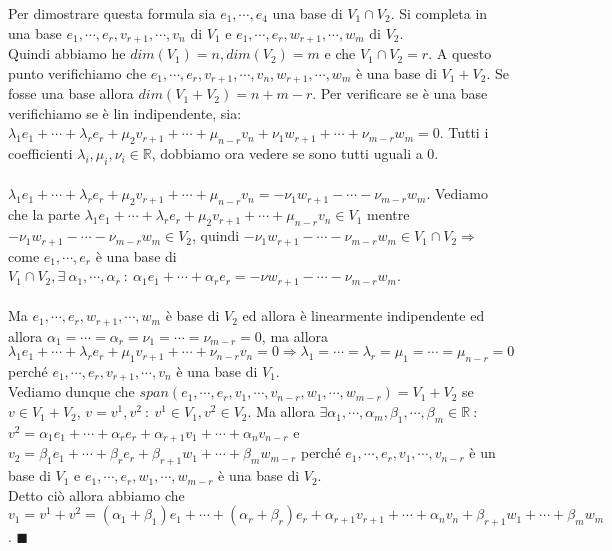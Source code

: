 \begin{demostration}
Per dimostrare questa formula sia $e_1, \cdots, e_4$ una base di $V_1 \cap V_2$. Si completa in una base $e_1, \cdots, e_r, v_{r+1}, \cdots, v_n$ di $V_1$ e $e_1, \cdots, e_r, w_{r+1}, \cdots, w_m$ di $V_2$. \\
Quindi abbiamo he $dim(V_1) = n, dim(V_2) = m$ e che $V_1 \cap V_2 = r$. A questo punto verifichiamo che $e_1, \cdots, e_r, v_{r+1}, \cdots, v_n, w_{r+1}, \cdots, w_m$ è una base di $V_1 + V_2$. Se fosse una base allora $dim(V_1 + V_2) = n + m - r$.
Per verificare se è una base verifichiamo se è lin indipendente, sia:\\
$\lambda_1 e_1 + \cdots + \lambda_r e_r + \mu_2 v_{r+1} + \cdots + \mu_{n-r}v_n + \nu_1 w_{r+1} + \cdots + \nu_{m-r}w_m = 0$. Tutti i coefficienti $\lambda_i, \mu_i, \nu_i \in \mathbb{R}$, dobbiamo ora vedere se sono tutti uguali a 0.\\\\
$\lambda_1 e_1 + \cdots + \lambda_r e_r + \mu_2 v_{r+1} + \cdots + \mu_{n-r}v_n = -\nu_1 w_{r+1} - \cdots - \nu_{m-r}w_m$. Vediamo che la parte $\lambda_1 e_1 + \cdots + \lambda_r e_r + \mu_2 v_{r+1} + \cdots + \mu_{n-r}v_n \in V_1$ mentre $-\nu_1 w_{r+1} - \cdots - \nu_{m-r}w_m \in V_2$, quindi $-\nu_1 w_{r+1} - \cdots - \nu_{m-r}w_m \in V_1 \cap V_2 \Longrightarrow$ come $e_1, \cdots, e_r$ è una base di $V_1 \cap V_2, \exists \: \alpha_1, \cdots, \alpha_r \::\: \alpha_1 e_1 + \cdots + \alpha_r e_r = -\nu w_{r+1} - \cdots - \nu_{m-r}w_m$. \\\\
Ma $e_1, \cdots, e_r, w_{r+1}, \cdots, w_m$ è base di $V_2$ ed allora è linearmente indipendente ed allora $\alpha_1 = \cdots = \alpha_r = \nu_1 = \cdots = \nu_{m-r} = 0$, ma allora $\lambda_1 e_1 + \cdots + \lambda_r e_r + \mu_1 v_{r+1} + \cdots + \nu_{n-r}v_n = 0 \Longrightarrow \lambda_1 = \cdots = \lambda_r = \mu_1 = \cdots = \mu_{n-r} = 0$ perché $e_1, \cdots, e_r, v_{r+1}, \cdots, v_n$ è una base di $V_1$.\\
Vediamo dunque che $span(e_1, \cdots, e_r, v_1, \cdots, v_{n-r}, w_1, \cdots, w_{m-r}) = V_1 + V_2$ se $v \in V_1 + V_2$, $v = v^1, v^2 \::\: v^1 \in V_1, v^2 \in V_2$. Ma allora $\exists \alpha_1, \cdots, \alpha_m, \beta_1, \cdots, \beta_m \in \mathbb{R} \::$\\
$v^2 = \alpha_1 e_1 + \cdots + \alpha_r e_r + \alpha_{r+1}v_1 + \cdots + \alpha_n v_{n-r}$ e $v_2 = \beta_1 e_1 + \cdots + \beta_r e_r + \beta_{r+1}w_1 + \cdots + \beta_m w_{m-r}$ perché $e_1, \cdots, e_r, v_1, \cdots, v_{n-r}$ è un base di $V_1$ e $e_1, \cdots, e_r, w_1, \cdots, w_{m-r}$ è una base di $V_2$. \\
Detto ciò allora abbiamo che $v_1 = v^1 + v^2 = (\alpha_1 + \beta_1)e_1 + \cdots + (\alpha_r + \beta_r)e_r + \alpha_{r+1}v_{r+1} + \cdots + \alpha_n v_n + \beta_{r+1}w_1 + \cdots + \beta_m w_m$. $\blacksquare$
\end{demostration}

